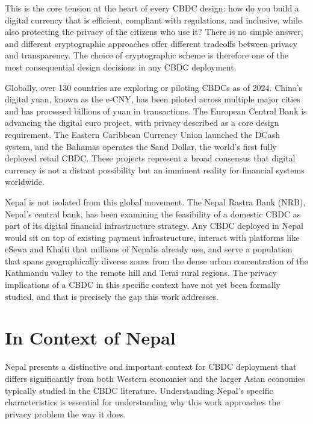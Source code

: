 This is the core tension at the heart of every CBDC design:
how do you build a digital currency that is efficient,
compliant with regulations, and inclusive, while also
protecting the privacy of the citizens who use it? There is
no simple answer, and different cryptographic approaches offer
different tradeoffs between privacy and transparency. The
choice of cryptographic scheme is therefore one of the most
consequential design decisions in any CBDC deployment.

Globally, over 130 countries are exploring or piloting CBDCs
as of 2024. China's digital yuan, known as the e-CNY, has
been piloted across multiple major cities and has processed
billions of yuan in transactions. The European Central Bank
is advancing the digital euro project, with privacy described
as a core design requirement. The Eastern Caribbean Currency
Union launched the DCash system, and the Bahamas operates the
Sand Dollar, the world's first fully deployed retail CBDC.
These projects represent a broad consensus that digital
currency is not a distant possibility but an imminent reality
for financial systems worldwide.

Nepal is not isolated from this global movement. The Nepal
Rastra Bank (NRB), Nepal's central bank, has been examining
the feasibility of a domestic CBDC as part of its digital
financial infrastructure strategy. Any CBDC deployed in Nepal
would sit on top of existing payment infrastructure, interact
with platforms like eSewa and Khalti that millions of Nepalis
already use, and serve a population that spans geographically
diverse zones from the dense urban concentration of the
Kathmandu valley to the remote hill and Terai rural regions.
The privacy implications of a CBDC in this specific context
have not yet been formally studied, and that is precisely the
gap this work addresses.

\section{In Context of Nepal}
\label{sec:nepal_context}

Nepal presents a distinctive and important context for CBDC
deployment that differs significantly from both Western
economies and the larger Asian economies typically studied in
the CBDC literature. Understanding Nepal's specific
characteristics is essential for understanding why this
work approaches the privacy problem the way it does.

